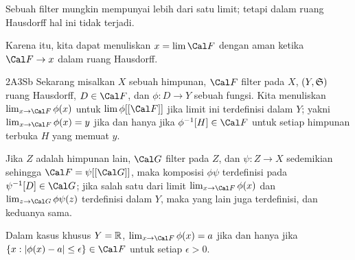 
Sebuah filter mungkin mempunyai lebih dari satu
limit; tetapi dalam ruang Hausdorff hal ini tidak terjadi.

Karena itu, kita dapat menuliskan $x=\lim\Cal F$ dengan aman ketika
$\Cal F\to x$ dalam ruang Hausdorff.

\spheader 2A3Sb Sekarang misalkan $X$ sebuah himpunan, $\Cal F$ filter
pada $X$, $(Y,\frak S)$ ruang Hausdorff, $D\in\Cal F$, dan
$\phi:D\to Y$ sebuah fungsi. Kita menuliskan
$\lim_{x\to\Cal F}\phi(x)$ untuk $\lim\phi[[\Cal F]]$ jika limit ini
terdefinisi dalam $Y$; yakni $\lim_{x\to\Cal F}\phi(x)=y$ jika dan hanya
jika $\phi^{-1}[H]\in\Cal F$ untuk setiap himpunan terbuka $H$ yang
memuat $y$.

Jika $Z$ adalah himpunan lain, $\Cal G$ filter pada $Z$,
dan $\psi:Z\to X$ sedemikian sehingga $\Cal F=\psi[[\Cal G]]$, maka
komposisi $\phi\psi$ terdefinisi pada $\psi^{-1}[D]\in\Cal G$; jika
salah satu dari limit $\lim_{x\to\Cal F}\phi(x)$ dan
$\lim_{z\to\Cal G}\phi\psi(z)$ terdefinisi dalam $Y$, maka yang lain juga
terdefinisi, dan keduanya sama. 

Dalam kasus khusus $Y=\Bbb R$, $\lim_{x\to\Cal F}\phi(x)=a$ jika dan
hanya jika
$\{x:|\phi(x)-a|\le\epsilon\}\in\Cal F$ untuk setiap
$\epsilon>0$.

